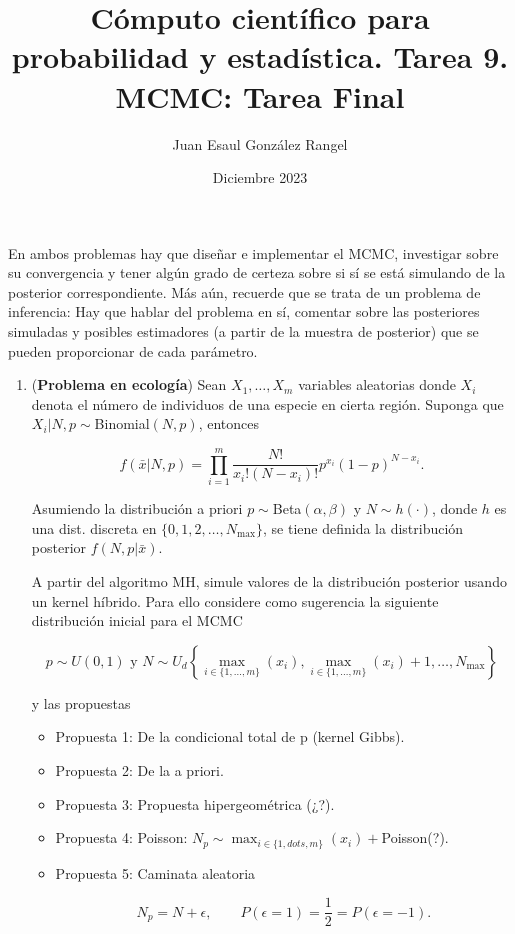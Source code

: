 \documentclass{article}
\title{Cómputo científico para probabilidad y estadística. Tarea 9.\\
MCMC: Tarea Final}
\author{Juan Esaul González Rangel}
\date{Diciembre 2023}
\begin{document}
\maketitle

En ambos problemas hay que diseñar e implementar el MCMC, investigar sobre su 
convergencia y tener algún grado de certeza sobre si sí se está simulando de la 
posterior correspondiente. Más aún, recuerde que se trata de un problema de 
inferencia: Hay que hablar del problema en sí, comentar sobre las posteriores 
simuladas y posibles estimadores (a partir de la muestra de posterior) que se 
pueden proporcionar de cada parámetro.

\begin{enumerate}
    \item (\textbf{Problema en ecología}) Sean $X_1, \dots, X_m$ variables aleatorias 
    donde $X_i$ denota el número de individuos de una especie en cierta región. 
    Suponga que $X_i|N, p \sim $Binomial$(N, p)$, entonces
    
    \[f (\bar x|N, p) = \prod_{i=1}^m \frac{N!}{x_i!(N - x_i)!}p^{x_i} 
    (1 - p)^{N - x_i}.\]

    Asumiendo la distribución a priori $p \sim $Beta$(\alpha, \beta)$ y 
    $N \sim h(\cdot)$, donde $h$ es una dist. discreta en $\{0, 1, 2, \dots , 
    N_{\max} \}$, se tiene definida la distribución posterior $f (N, p |\bar x)$.
    
    A partir del algoritmo MH, simule valores de la distribución posterior usando un 
    kernel híbrido. Para ello considere como sugerencia la siguiente distribución 
    inicial para el MCMC 
    
    \[p \sim U(0, 1) \text{ y } N \sim U_d \left\{\max_{i\in\{1,\dots,m\}}(x_i), 
    \max_{i\in\{1,\dots,m\}}(x_i) + 1, \dots , N_{\max}\right\}\]
    
    y las propuestas

    \begin{itemize}
        \item Propuesta 1: De la condicional total de p (kernel Gibbs).
        \item Propuesta 2: De la a priori.
        \item Propuesta 3: Propuesta hipergeométrica (¿?).
        \item Propuesta 4: Poisson: $N_p \sim \max_{i\in\{1,dots,m\}}(x_i) + 
        $Poisson(?).
        \item Propuesta 5: Caminata aleatoria
    
    \[N_p = N + \epsilon, \qquad P(\epsilon = 1) = \frac12 = P(\epsilon = -1).\]
    

\end{itemize}
\end{enumerate}
\end{document}
